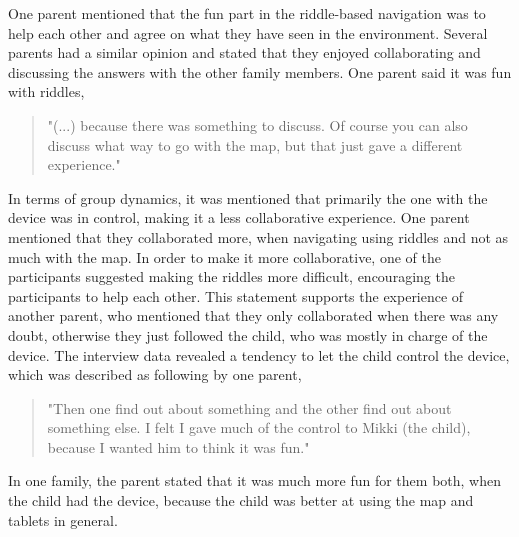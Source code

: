 One parent mentioned that the fun part in the riddle-based navigation was to help each other and agree on what they have seen in the environment. Several parents had a similar opinion and stated that they enjoyed collaborating and discussing the answers with the other family members. One parent said it was fun with riddles, 

\begin{quote}
    "(...) because there was something to discuss. Of course you can also discuss what way to go with the map, but that just gave a different experience."
\end{quote}

In terms of group dynamics, it was mentioned that primarily the one with the device was in control, making it a less collaborative experience. One parent mentioned that they collaborated more, when navigating using riddles and not as much with the map. In order to make it more collaborative, one of the participants suggested making the riddles more difficult, encouraging the participants to help each other. This statement supports the experience of another parent, who mentioned that they only collaborated when there was any doubt, otherwise they just followed the child, who was mostly in charge of the device. The interview data revealed a tendency to let the child control the device, which was described as following by one parent,  

\begin{quote}
    "Then one find out about something and the other find out about something else. I 
felt I gave much of the control to Mikki (the child), because I wanted him to think it 
was fun."
\end{quote}
 
In one family, the parent stated that it was much more fun for them both, when the child had the device, because the child was better at using the map and tablets in general.